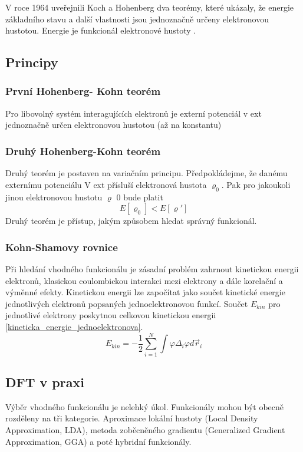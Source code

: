 \documentclass[
  digital, %
  table,   %
  lof,     %
  lot,     %
]{fithesis3}
\begin{document}
V roce 1964 uveřejnili Koch a Hohenberg dva teorémy, které ukázaly, že energie základního stavu  a další vlastnosti jsou jednoznačně určeny elektronovou hustotou. Energie je funkcionál elektronové hustoty .
\cite{lechamolecularmodeling}
\subsection{Principy}
\subsubsection{První Hohenberg- Kohn teorém}
Pro libovolný systém interagujících elektronů je externí potenciál v ext jednoznačně
určen elektronovou hustotou (až na konstantu)
\subsubsection{Druhý Hohenberg-Kohn teorém}
Druhý teorém je postaven na variačním principu.
\cite{koch2000chemist} 
Předpokládejme, že danému externímu potenciálu V ext přísluší elektronová hustota
$\varrho_0$. Pak pro jakoukoli jinou elektronovou hustotu $\varrho$
0 bude platit
\begin{equation}
E [\varrho_0] < E[\varrho ']
\end{equation}
Druhý teorém je přístup, jakým způsobem hledat správný funkcionál.
\subsubsection{Kohn-Shamovy rovnice}
Při hledání vhodného funkcionálu je zásadní problém zahrnout kinetickou energii elektronů, klasickou coulombickou interakci mezi elektrony a dále korelační a výměnné efekty. Kinetickou energii lze započítat jako součet kinetické energie jednotlivých elektronů popsaných jednoelektronovou funkcí. Součet $E_{kin}$ pro jednotlivé elektrony poskytnou celkovou kinetickou energii \ref{kineticka_energie_jednoelektronova}. \cite{dftshrnutivysledky}
\begin{equation}
E_{kin} = -\frac{1}{2} \sum_{i=1} ^{N} \int \varphi \Delta_i \varphi d \vec{r}_i
\label{kineticka_energie_jednoelektronova}
\end{equation}
\subsection{DFT v praxi}
Výběr vhodného funkcionálu je nelehký úkol. Funkcionály mohou být obecně rozděleny na tři kategorie. Aproximace lokální hustoty (Local Density Approximation, LDA), metoda zoběcněného gradientu (Generalized Gradient Approximation, GGA) a poté hybridní funkcionály. \cite{dftshrnutivysledky}
\end{document}
